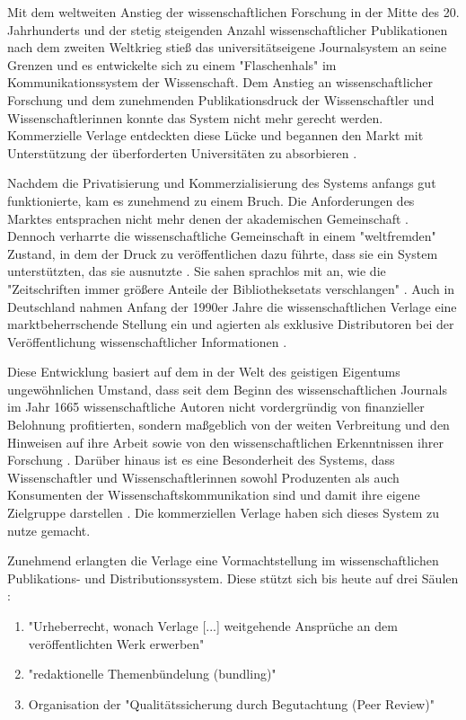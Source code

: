 Mit dem weltweiten Anstieg der wissenschaftlichen Forschung in der Mitte des 20. Jahrhunderts und der stetig steigenden Anzahl wissenschaftlicher Publikationen nach dem zweiten Weltkrieg stieß das universitätseigene Journalsystem an seine Grenzen und es entwickelte sich zu einem "Flaschenhals" \cite{epaa_Weiner_2001} im Kommunikationssystem der Wissenschaft. Dem Anstieg an wissenschaftlicher Forschung und dem zunehmenden Publikationsdruck der Wissenschaftler und Wissenschaftlerinnen konnte das System nicht mehr gerecht werden. Kommerzielle Verlage entdeckten diese Lücke und begannen den Markt mit Unterstützung der überforderten Universitäten zu absorbieren \cite{Hirschi_2015_buch_oa}.

Nachdem die Privatisierung und Kommerzialisierung des Systems anfangs gut funktionierte, kam es zunehmend zu einem Bruch. Die Anforderungen des Marktes entsprachen nicht mehr denen der akademischen Gemeinschaft \cite{epaa_Weiner_2001}. Dennoch verharrte die wissenschaftliche Gemeinschaft in einem "weltfremden" Zustand, in dem der Druck zu veröffentlichen dazu führte, dass sie ein System unterstützten, das sie ausnutzte \cite{epaa_Weiner_2001}. Sie sahen sprachlos mit an, wie die "Zeitschriften immer größere Anteile der Bibliotheksetats verschlangen" \cite{hagner_2015_sache_buches}. Auch in Deutschland nahmen Anfang der 1990er Jahre die wissenschaftlichen Verlage eine marktbeherrschende Stellung ein und agierten als exklusive Distributoren bei der Veröffentlichung wissenschaftlicher Informationen \cite{schloegl_2005} \cite{offhaus_2012_institutionelle_repos}.

Diese Entwicklung basiert auf dem in der Welt des geistigen Eigentums ungewöhnlichen Umstand, dass seit dem Beginn des wissenschaftlichen Journals im Jahr 1665 wissenschaftliche Autoren nicht vordergründig von finanzieller Belohnung profitierten, sondern maßgeblich von der weiten Verbreitung und den Hinweisen auf ihre Arbeit sowie von den wissenschaftlichen Erkenntnissen ihrer Forschung \cite{albert_2006_open_implications}. Darüber hinaus ist es eine Besonderheit des Systems, dass Wissenschaftler und Wissenschaftlerinnen sowohl Produzenten als auch Konsumenten der Wissenschaftskommunikation sind und damit ihre eigene Zielgruppe darstellen \cite{Hess_2006}. Die kommerziellen Verlage haben sich dieses System zu nutze gemacht.

Zunehmend erlangten die Verlage eine Vormachtstellung im wissenschaftlichen Publikations- und Distributionssystem. Diese stützt sich bis heute auf drei Säulen \cite{offhaus_2012_institutionelle_repos} \cite{bargheer_2006_open}:
\begin{enumerate}
\item "Urheberrecht, wonach Verlage [...] weitgehende Ansprüche an dem veröffentlichten Werk erwerben"
\item "redaktionelle Themenbündelung (bundling)"
\item Organisation der "Qualitätssicherung durch Begutachtung (Peer Review)"
\end{enumerate}


